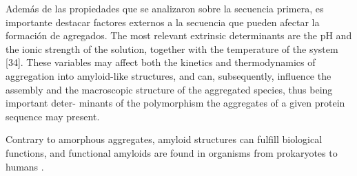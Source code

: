 % 










Además de las propiedades que se analizaron sobre la secuencia primera, es importante destacar factores externos a la secuencia que pueden afectar la formación de agregados.
The most relevant extrinsic determinants are the pH and
the ionic strength of the solution, together with the temperature of the system [34].
These variables may affect both the kinetics and thermodynamics of aggregation
into amyloid-like structures, and can, subsequently, influence the assembly and
the macroscopic structure of the aggregated species, thus being important deter-
minants of the polymorphism the aggregates of a given protein sequence may
present.








Contrary to amorphous aggregates, amyloid structures can fulfill biological functions, and functional amyloids are found in organisms from prokaryotes to humans \cite{fowler2007functional}.

